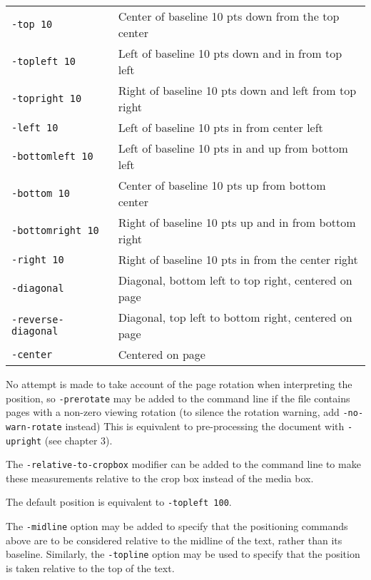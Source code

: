 \documentclass{book}
\begin{document}
  \begin{framed}
    \noindent\begin{tabular}{ll}
      \small\verb!-top 10! & Center of baseline 10 pts down from the top center \\
      \small\verb!-topleft 10! & Left of baseline 10 pts down and in from top left \\
      \small\verb!-topright 10! & Right of baseline 10 pts down and left from top right\\
      \small\verb!-left 10! & Left of baseline 10 pts in from center left \\
      \small\verb!-bottomleft 10! & Left of baseline 10 pts in and up from bottom left \\
      \small\verb!-bottom 10! & Center of baseline 10 pts up from bottom center\\
      \small\verb!-bottomright 10! & Right of baseline 10 pts up and in from bottom right \\
      \small\verb!-right 10! & Right of baseline 10 pts in from the center right \\
      \small\verb!-diagonal! & Diagonal, bottom left to top right, centered on page\\
      \small\verb!-reverse-diagonal! & Diagonal, top left to bottom right, centered on page\\    
      \small\verb!-center! & Centered on page\\
    \end{tabular}
  \end{framed}

\noindent No attempt is made to take account of the page rotation when interpreting the
position, so \texttt{-prerotate} may be added to the command line if the file
contains pages with a non-zero viewing rotation (to silence the rotation warning, add \texttt{-no-warn-rotate} instead) This is equivalent to
pre-processing the document with \texttt{-upright} (see chapter 3).
   
The \texttt{-relative-to-cropbox} modifier can be added to the command line to
make these measurements relative to the crop box instead of the media box.

The default position is equivalent to \texttt{-topleft 100}.

The \texttt{-midline} option may be added to specify that the positioning
commands above are to be considered relative to the midline of the text, rather
than its baseline. Similarly, the \texttt{-topline} option may be used to specify that the position is taken relative to the top of the text.
\end{document}
